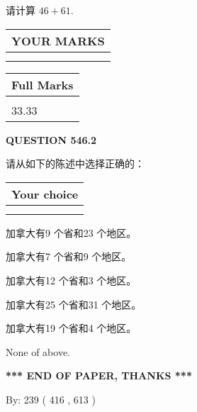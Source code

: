 \documentclass{ctexart}
\begin{document}
  
 
请计算 $ %
46 +  %
61 $.
 

 

 
  
\vspace{0.2in}
  
\noindent\begin{tabular}{|l|}
\hline
 YOUR MARKS  \\
\hline
 \\ 
 \\ 
\hline
\end{tabular}
\hspace{0.05in} \begin{tabular}{|l|}
\hline
 Full Marks  \\
\hline
 \\ 
33.33 \\
\hline
\end{tabular}
{\textbf{\Large{QUESTION
546.2 
}}}
  
  
请从如下的陈述中选择正确的：
  
  
\noindent\hspace{3.0in} \begin{tabular}{|l|}
\hline
Your choice \\
\hline
 \\ 
 \\ 
\hline
\end{tabular}
  
  
 
 
加拿大有9 个省和23 个地区。
 
 
加拿大有7 个省和9 个地区。
 
 
加拿大有12 个省和3 个地区。
 
 
加拿大有25 个省和31 个地区。
 
 
加拿大有19 个省和4 个地区。
 
 
 None of above.
 
 
   
   
 \vspace{0.2in}
 
   
   
   
   
\vspace{1.0in} 
{\textbf{\large{ *** END OF PAPER, THANKS *** }}} 
   
   
\hspace{1.0in} By: 
 239 ( 416 ,  613 )
   
\end{document}
